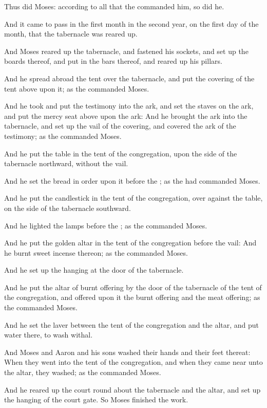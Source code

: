 \verse Thus did Moses: according to all that the \LORD commanded him, so did he.

\verse And it came to pass in the first month in the second year, on the first day of the month, that the tabernacle was reared up.

\verse And Moses reared up the tabernacle, and fastened his sockets, and set up the boards thereof, and put in the bars thereof, and reared up his pillars.

\verse And he spread abroad the tent over the tabernacle, and put the covering of the tent above upon it; as the \LORD commanded Moses.

\verse And he took and put the testimony into the ark, and set the staves on the ark, and put the mercy seat above upon the ark: \verse And he brought the ark into the tabernacle, and set up the vail of the covering, and covered the ark of the testimony; as the \LORD commanded Moses.

\verse And he put the table in the tent of the congregation, upon the side of the tabernacle northward, without the vail.

\verse And he set the bread in order upon it before the \LORD; as the \LORD had commanded Moses.

\verse And he put the candlestick in the tent of the congregation, over against the table, on the side of the tabernacle southward.

\verse And he lighted the lamps before the \LORD; as the \LORD commanded Moses.

\verse And he put the golden altar in the tent of the congregation before the vail: \verse And he burnt sweet incense thereon; as the \LORD commanded Moses.

\verse And he set up the hanging at the door of the tabernacle.

\verse And he put the altar of burnt offering by the door of the tabernacle of the tent of the congregation, and offered upon it the burnt offering and the meat offering; as the \LORD commanded Moses.

\verse And he set the laver between the tent of the congregation and the altar, and put water there, to wash withal.

\verse And Moses and Aaron and his sons washed their hands and their feet thereat: \verse When they went into the tent of the congregation, and when they came near unto the altar, they washed; as the \LORD commanded Moses.

\verse And he reared up the court round about the tabernacle and the altar, and set up the hanging of the court gate. So Moses finished the work.

